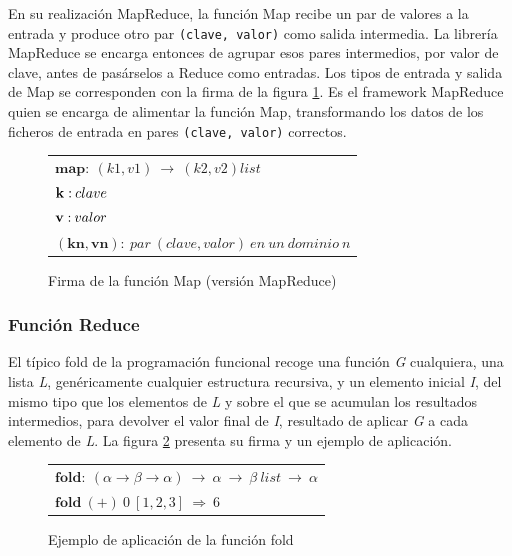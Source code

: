 En su realizaci\'on MapReduce, la funci\'on Map recibe un par de valores a la entrada y produce otro par \texttt{(clave, valor)} como salida intermedia. La librer\'ia MapReduce se encarga entonces de agrupar esos pares intermedios, por valor de clave, antes de pas\'arselos a Reduce como entradas. Los tipos de entrada y salida de Map se corresponden con la firma de la figura \ref{fig:mapreducemap}. Es el framework MapReduce quien se encarga de alimentar la funci\'on Map, transformando los datos de los ficheros de entrada en pares \texttt{(clave, valor)} correctos.

\begin{figure}[tbp]
\begin{center}
\begin{tabular}{|l|}
\hline
$\mathbf{map:} \: \left( k1,v1 \right) \: \rightarrow \: \left( k2,v2 \right) list$ \\
$\mathbf{k:} \: clave \linebreak$ \\
$\mathbf{v:} \: valor \linebreak$ \\
$\mathbf{\left(kn,vn \right):} \: par \: \left( clave,valor \right) \: en \: un \: dominio \: n$ \\
\hline
\end{tabular}
\caption{Firma de la funci\'on Map (versi\'on MapReduce)}
\label{fig:mapreducemap}
\end{center}
\end{figure}


\subsubsection{Funci\'on Reduce}\label{reduce}
\noindent El t\'ipico fold de la programaci\'on funcional recoge una funci\'on \emph{G} cualquiera, una lista \emph{L}, gen\'ericamente cualquier estructura recursiva, y un elemento inicial \emph{I}, del mismo tipo que los elementos de \emph{L} y sobre el que se acumulan los resultados intermedios, para devolver el valor final de \emph{I}, resultado de aplicar \emph{G} a cada elemento de \emph{L}. La figura \ref{fig:fold} presenta su firma y un ejemplo de aplicaci\'on.\newline

\begin{figure}[tbp]
\begin{center}
\begin{tabular}{|l|}
\hline
$\mathbf{fold:} \: \left( \alpha \rightarrow \beta \rightarrow \alpha \right) \: \rightarrow \: \alpha \: \rightarrow \: \beta \: list \: \rightarrow \: \alpha$ \\
$\mathbf{fold} \: \left( \mathbf{+} \right) \: 0 \: \left[ 1,2,3 \right] \: \Rightarrow \: 6$ \\
\hline
\end{tabular}
\caption{Ejemplo de aplicaci\'on de la funci\'on fold}
\label{fig:fold}
\end{center}
\end{figure}


